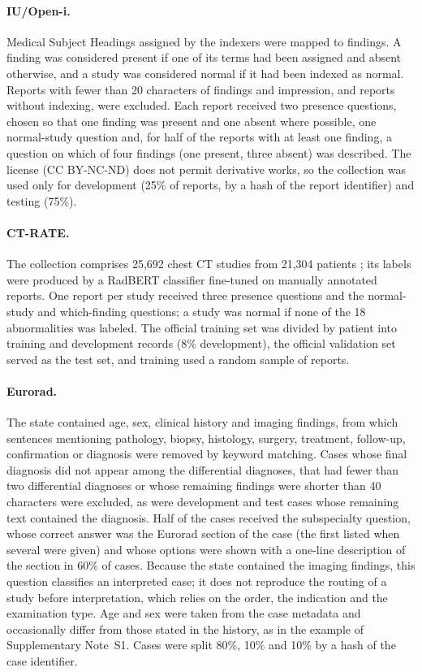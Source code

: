 \documentclass[11pt]{article}
\begin{document}
\paragraph{IU/Open-i.} Medical Subject Headings assigned by the indexers were mapped to  findings. A finding was considered present if one of its terms had been assigned and absent otherwise, and a study was considered normal if it had been indexed as normal. Reports with fewer than 20 characters of findings and impression, and reports without indexing, were excluded. Each report received two presence questions, chosen so that one finding was present and one absent where possible, one normal-study question and, for half of the reports with at least one finding, a question on which of four findings (one present, three absent) was described. The license (CC BY-NC-ND) does not permit derivative works, so the collection was used only for development (25\% of reports, by a hash of the report identifier) and testing (75\%).

\paragraph{CT-RATE.} The collection comprises 25,692 chest CT studies from 21,304 patients \citep{hamamci2026ctrate}; its labels were produced by a RadBERT classifier fine-tuned on manually annotated reports. One report per study received three presence questions and the normal-study and which-finding questions; a study was normal if none of the 18 abnormalities was labeled. The official training set was divided by patient into training and development records (8\% development), the official validation set served as the test set, and training used a random sample of  reports.

\paragraph{Eurorad.} The state contained age, sex, clinical history and imaging findings, from which sentences mentioning pathology, biopsy, histology, surgery, treatment, follow-up, confirmation or diagnosis were removed by keyword matching. Cases whose final diagnosis did not appear among the differential diagnoses, that had fewer than two differential diagnoses or whose remaining findings were shorter than 40 characters were excluded, as were development and test cases whose remaining text contained the diagnosis. Half of the cases received the subspecialty question, whose correct answer was the Eurorad section of the case (the first listed when several were given) and whose options were shown with a one-line description of the section in 60\% of cases. Because the state contained the imaging findings, this question classifies an interpreted case; it does not reproduce the routing of a study before interpretation, which relies on the order, the indication and the examination type. Age and sex were taken from the case metadata and occasionally differ from those stated in the history, as in the example of Supplementary Note~S1. Cases were split 80\%, 10\% and 10\% by a hash of the case identifier.
\end{document}
